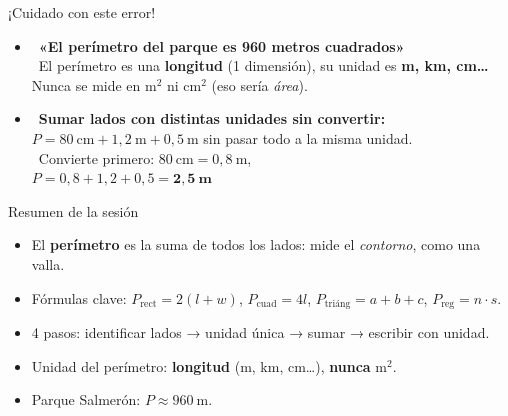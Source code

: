 \documentclass[aspectratio=169, 10pt, spanish]{beamer}
\begin{document}
\begin{frame}{¡Cuidado con este error!}
  \begin{errorbox}
    \begin{itemize}
      \item \incorrecto\
            \textbf{«El perímetro del parque es 960 metros cuadrados»}
            \\[6pt]
            \correcto\
            El perímetro es una \textbf{longitud} (1 dimensión),
            su unidad es \textbf{m, km, cm…}
            \\
            Nunca se mide en m$^2$ ni cm$^2$
            (eso sería \emph{área}).
      \vspace{0.4cm}
      \item \incorrecto\
            \textbf{Sumar lados con distintas unidades sin convertir:}
            \\
            $P = 80\ \text{cm} + 1{,}2\ \text{m} + 0{,}5\ \text{m}$
            sin pasar todo a la misma unidad.
            \\[6pt]
            \correcto\
            Convierte primero: $80\ \text{cm} = 0{,}8\ \text{m}$,
            \\
            $P = 0{,}8 + 1{,}2 + 0{,}5 = \mathbf{2{,}5\ \text{m}}$
    \end{itemize}
  \end{errorbox}
\end{frame}

\begin{frame}{Resumen de la sesión}
  \begin{resumenbox}
    \begin{itemize}
      \item El \textbf{perímetro} es la suma de todos los lados:
            mide el \emph{contorno}, como una valla.
      \item Fórmulas clave:
        $P_{\text{rect}} = 2(l+w)$, \quad
        $P_{\text{cuad}} = 4l$, \quad
        $P_{\text{triáng}} = a+b+c$, \quad
        $P_{\text{reg}} = n\cdot s$.
      \item 4 pasos: identificar lados → unidad única →
            sumar → escribir con unidad.
      \item Unidad del perímetro: \textbf{longitud} (m, km, cm…),
            \textbf{nunca} m$^2$.
      \item Parque Salmerón: $P \approx 960\ \text{m}$.
    \end{itemize}
  \end{resumenbox}
\end{frame}
\end{document}
